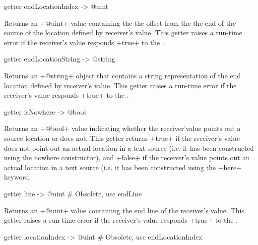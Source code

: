 
\begin{galgas3}
getter endLocationIndex -> @uint
\end{galgas3}

Returns an \ggst+@uint+ value containing the the offset from the the end of the source of the location defined by receiver's value. This getter raises a run-time error if the receiver's value responds \ggst+true+ to the .




\begin{galgas3}
getter endLocationString -> @string
\end{galgas3}

Returns an \ggst+@string+ object that contains a string representation of the end location defined by receiver's value. This getter raises a run-time error if the receiver's value responds \ggst+true+ to the .



\begin{galgas3}
getter isNowhere -> @bool
\end{galgas3}

Returns an \ggst+@bool+ value indicating whether the receiver'value points out a source location or does not. This getter returns \ggst+true+ if the receiver's value does not point out an actual location in a text source (i.e. it has been constructed using the nowhere constructor), and \ggst+false+ if the receiver's value points out an actual location in a text source (i.e. it has been constructed using the \ggst+here+ keyword.



\begin{galgas3}
getter line -> @uint  # Obsolete, use endLine
\end{galgas3}

Returns an \ggst+@uint+ value containing the end line of the receiver's value. This getter raises a run-time error if the receiver's value responds \ggst+true+ to the .




\begin{galgas3}
getter locationIndex -> @uint # Obsolete, use endLocationIndex
\end{galgas3}

